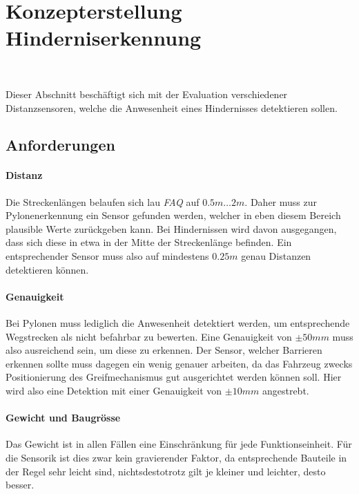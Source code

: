 \documentclass[main.tex]{subfiles} %
\begin{document}

\section{Konzepterstellung Hinderniserkennung}~\label{appendix:Hindernisserkennung}

Dieser Abschnitt beschäftigt sich mit der Evaluation verschiedener
Distanzsensoren, welche die Anwesenheit eines Hindernisses detektieren sollen.

\subsection*{Anforderungen}

\paragraph{Distanz}
Die Streckenlängen belaufen sich lau \textit{FAQ} auf $0.5m \dots 2m$. Daher
muss zur Pylonenerkennung ein Sensor gefunden werden, welcher in eben diesem
Bereich plausible Werte zurückgeben kann. Bei Hindernissen wird davon
ausgegangen, dass sich diese in etwa in der Mitte der Streckenlänge befinden.
Ein entsprechender Sensor muss also auf mindestens $0.25 m$ genau Distanzen
detektieren können.

\paragraph{Genauigkeit}
Bei Pylonen muss lediglich die Anwesenheit detektiert werden, um entsprechende
Wegstrecken als nicht befahrbar zu bewerten. Eine Genauigkeit von $\pm 50 mm$
muss also ausreichend sein, um diese zu erkennen. Der Sensor, welcher Barrieren
erkennen sollte muss dagegen ein wenig genauer arbeiten, da das Fahrzeug zwecks
Positionierung des Greifmechanismus gut ausgerichtet werden können soll. Hier
wird also eine Detektion mit einer Genauigkeit von $\pm 10 mm$ angestrebt.

\paragraph{Gewicht und Baugrösse}
Das Gewicht ist in allen Fällen eine Einschränkung für jede Funktionseinheit.
Für die Sensorik ist dies zwar kein gravierender Faktor, da entsprechende
Bauteile in der Regel sehr leicht sind, nichtsdestotrotz gilt je kleiner und
leichter, desto besser.
\end{document}
